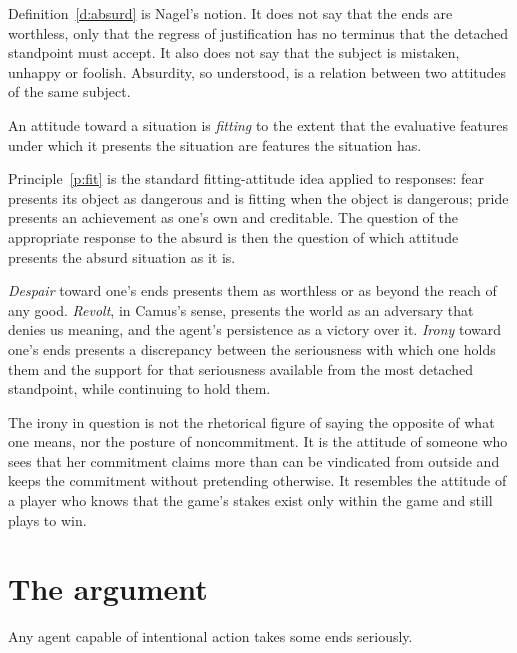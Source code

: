 \documentclass{situationist-preprint}
\begin{document}
Definition~\ref{d:absurd} is Nagel's notion. It does not say that the ends are worthless, only that the regress of justification has no terminus that the detached standpoint must accept. It also does not say that the subject is mistaken, unhappy or foolish. Absurdity, so understood, is a relation between two attitudes of the same subject.

\begin{principle}[Fit]\label{p:fit}
An attitude toward a situation is \emph{fitting} to the extent that the evaluative features under which it presents the situation are features the situation has.
\end{principle}

Principle~\ref{p:fit} is the standard fitting-attitude idea applied to responses: fear presents its object as dangerous and is fitting when the object is dangerous; pride presents an achievement as one's own and creditable. The question of the appropriate response to the absurd is then the question of which attitude presents the absurd situation as it is.

\begin{definition}\label{d:resp}
\emph{Despair} toward one's ends presents them as worthless or as beyond the reach of any good. \emph{Revolt}, in Camus's sense, presents the world as an adversary that denies us meaning, and the agent's persistence as a victory over it. \emph{Irony} toward one's ends presents a discrepancy between the seriousness with which one holds them and the support for that seriousness available from the most detached standpoint, while continuing to hold them.
\end{definition}

The irony in question is not the rhetorical figure of saying the opposite of what one means, nor the posture of noncommitment. It is the attitude of someone who sees that her commitment claims more than can be vindicated from outside and keeps the commitment without pretending otherwise. It resembles the attitude of a player who knows that the game's stakes exist only within the game and still plays to win.

\section{The argument}

\begin{lemma}\label{l:serious}
Any agent capable of intentional action takes some ends seriously.
\end{lemma}
\end{document}
